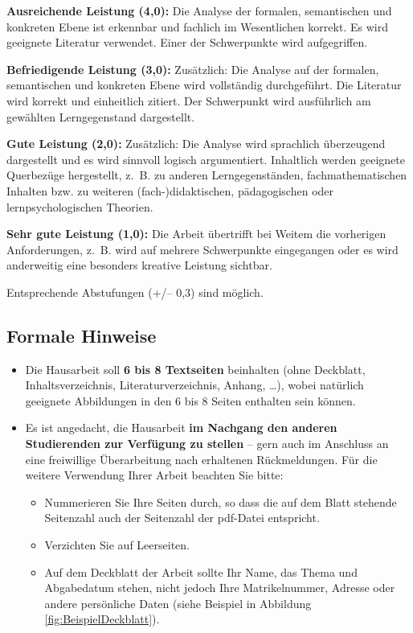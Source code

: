 \documentclass[
]{scrbook}
\providecommand{\tightlist}{%
  \setlength{\itemsep}{0pt}\setlength{\parskip}{0pt}}
\theoremstyle{definition}
\theoremstyle{definition}
\theoremstyle{definition}
\theoremstyle{definition}
\theoremstyle{remark}
\begin{document}
\textbf{Ausreichende Leistung (4,0):} Die Analyse der formalen, semantischen und konkreten Ebene ist erkennbar und fachlich im Wesentlichen korrekt. Es wird geeignete Literatur verwendet. Einer der Schwerpunkte wird aufgegriffen.

\textbf{Befriedigende Leistung (3,0):} Zusätzlich: Die Analyse auf der formalen, semantischen und konkreten Ebene wird vollständig durchgeführt. Die Literatur wird korrekt und einheitlich zitiert. Der Schwerpunkt wird ausführlich am gewählten Lerngegenstand dargestellt.

\textbf{Gute Leistung (2,0):} Zusätzlich: Die Analyse wird sprachlich überzeugend dargestellt und es wird sinnvoll logisch argumentiert. Inhaltlich werden geeignete Querbezüge hergestellt, z.~B. zu anderen Lerngegenständen, fachmathematischen Inhalten bzw. zu weiteren (fach-)didaktischen, pädagogischen oder lernpsychologischen Theorien.

\textbf{Sehr gute Leistung (1,0):} Die Arbeit übertrifft bei Weitem die vorherigen Anforderungen, z.~B. wird auf mehrere Schwerpunkte eingegangen oder es wird anderweitig eine besonders kreative Leistung sichtbar.

Entsprechende Abstufungen (+/-- 0,3) sind möglich.

\hypertarget{formale-hinweise}{%
\subsection{Formale Hinweise}\label{formale-hinweise}}

\begin{itemize}
\tightlist
\item
  Die Hausarbeit soll \textbf{6 bis 8 Textseiten} beinhalten (ohne Deckblatt, Inhaltsverzeichnis, Literaturverzeichnis, Anhang, \ldots), wobei natürlich geeignete Abbildungen in den 6 bis 8 Seiten enthalten sein können.
\item
  Es ist angedacht, die Hausarbeit \textbf{im Nachgang den anderen Studierenden zur Verfügung zu stellen} -- gern auch im Anschluss an eine freiwillige Überarbeitung nach erhaltenen Rückmeldungen. Für die weitere Verwendung Ihrer Arbeit beachten Sie bitte:

  \begin{itemize}
  \tightlist
  \item
    Nummerieren Sie Ihre Seiten durch, so dass die auf dem Blatt stehende Seitenzahl auch der Seitenzahl der pdf-Datei entspricht.
  \item
    Verzichten Sie auf Leerseiten.
  \item
    Auf dem Deckblatt der Arbeit sollte Ihr Name, das Thema und Abgabedatum stehen, nicht jedoch Ihre Matrikelnummer, Adresse oder andere persönliche Daten (siehe Beispiel in Abbildung \ref{fig:BeispielDeckblatt}).
  \end{itemize}
\end{itemize}
\end{document}
